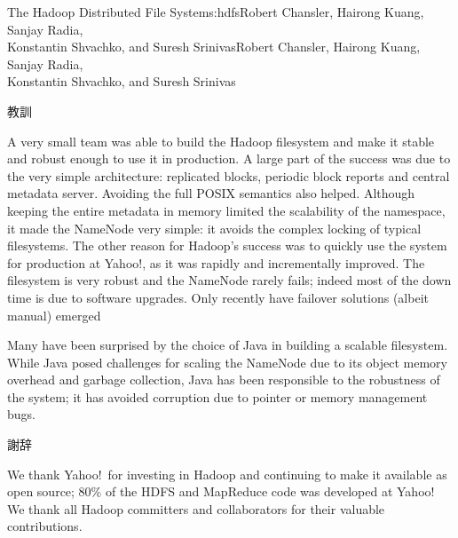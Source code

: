 \begin{aosachaptertoc}{The Hadoop Distributed File System}{s:hdfs}{Robert Chansler, Hairong Kuang, Sanjay Radia, \\ Konstantin Shvachko, and Suresh Srinivas}{Robert Chansler, Hairong Kuang, Sanjay Radia, \\ \hspace*{0.9cm} Konstantin Shvachko, and Suresh Srinivas}
\begin{aosasect1}{教訓}

A very small team was able to build the Hadoop filesystem and make it
stable and robust enough to use it in production.  A large part of the
success was due to the very simple architecture: replicated blocks,
periodic block reports and central metadata server. Avoiding the full
POSIX semantics also helped. Although keeping the entire metadata in
memory limited the scalability of the namespace, it made the NameNode
very simple: it avoids the complex locking of typical filesystems. The
other reason for Hadoop's success was to quickly use the system for
production at Yahoo!, as it was rapidly and incrementally
improved. The filesystem is very robust and the NameNode rarely fails;
indeed most of the down time is due to software upgrades. Only
recently have failover solutions (albeit manual) emerged

Many have been surprised by the choice of Java in building a scalable
filesystem. While Java posed challenges for scaling the NameNode due
to its object memory overhead and garbage collection, Java has been
responsible to the robustness of the system; it has avoided
corruption due to pointer or memory management bugs.

\end{aosasect1}

\begin{aosasect1}{謝辞}

We thank Yahoo!\ for investing in Hadoop and continuing to
make it available as open source; 80\% of the HDFS and MapReduce code
was developed at Yahoo! We thank all Hadoop committers and
collaborators for their valuable contributions.

\end{aosasect1}

\end{aosachaptertoc}
